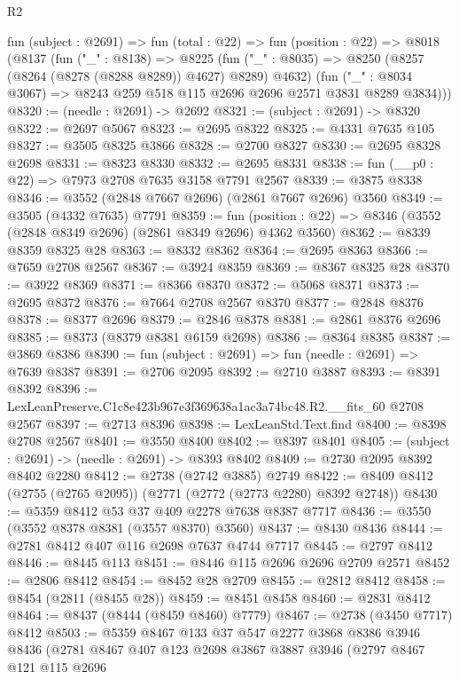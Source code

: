 \begin{lexlean}{R2}
\begin{coremodule}
  fun (subject : @2691) =>
  fun (total : @22) =>
  fun (position : @22) =>
  @8018
    (@8137
      (fun ("_" : @8138) =>
      @8225
        (fun ("_" : @8035) => @8250 (@8257 (@8264 (@8278 (@8288 @8289)) @4627) @8289) @4632)
        (fun ("_" : @8034 @3067) => @8243 @259 @518 @115 @2696 @2696 @2571 @3831 @8289 @3834)))
@8320 := (needle : @2691) -> @2692
@8321 := (subject : @2691) -> @8320
@8322 := @2697 @5067
@8323 := @2695 @8322
@8325 := @4331 @7635 @105
@8327 := @3505 @8325 @3866
@8328 := @2700 @8327
@8330 := @2695 @8328 @2698
@8331 := @8323 @8330
@8332 := @2695 @8331
@8338 := fun (__p0 : @22) => @7973 @2708 @7635 @3158 @7791 @2567
@8339 := @3875 @8338
@8346 := @3552 (@2848 @7667 @2696) (@2861 @7667 @2696) @3560
@8349 := @3505 (@4332 @7635) @7791
@8359 := fun (position : @22) => @8346 (@3552 (@2848 @8349 @2696) (@2861 @8349 @2696) @4362 @3560)
@8362 := @8339 @8359 @8325 @28
@8363 := @8332 @8362
@8364 := @2695 @8363
@8366 := @7659 @2708 @2567
@8367 := @3924 @8359
@8369 := @8367 @8325 @28
@8370 := @3922 @8369
@8371 := @8366 @8370
@8372 := @5068 @8371
@8373 := @2695 @8372
@8376 := @7664 @2708 @2567 @8370
@8377 := @2848 @8376
@8378 := @8377 @2696
@8379 := @2846 @8378
@8381 := @2861 @8376 @2696
@8385 := @8373 (@8379 @8381 @6159 @2698)
@8386 := @8364 @8385
@8387 := @3869 @8386
@8390 := fun (subject : @2691) => fun (needle : @2691) => @7639 @8387
@8391 := @2706 @2095
@8392 := @2710 @3887
@8393 := @8391 @8392
@8396 := LexLeanPreserve.C1c8e423b967e3f369638a1ac3a74bc48.R2.__fits_60 @2708 @2567
@8397 := @2713 @8396
@8398 := LexLeanStd.Text.find
@8400 := @8398 @2708 @2567
@8401 := @3550 @8400
@8402 := @8397 @8401
@8405 := (subject : @2691) -> (needle : @2691) -> @8393 @8402
@8409 := @2730 @2095 @8392 @8402 @2280
@8412 := @2738 (@2742 @3885) @2749
@8422 := @8409 @8412 (@2755 (@2765 @2095)) (@2771 (@2772 (@2773 @2280) @8392 @2748))
@8430 := @5359 @8412 @53 @37 @409 @2278 @7638 @8387 @7717
@8436 := @3550 (@3552 @8378 @8381 (@3557 @8370) @3560)
@8437 := @8430 @8436
@8444 := @2781 @8412 @407 @116 @2698 @7637 @4744 @7717
@8445 := @2797 @8412
@8446 := @8445 @113
@8451 := @8446 @115 @2696 @2696 @2709 @2571
@8452 := @2806 @8412
@8454 := @8452 @28 @2709
@8455 := @2812 @8412
@8458 := @8454 (@2811 (@8455 @28))
@8459 := @8451 @8458
@8460 := @2831 @8412
@8464 := @8437 (@8444 (@8459 @8460) @7779)
@8467 := @2738 (@3450 @7717) @8412
@8503 := @5359
    @8467
    @133
    @37
    @547
    @2277
    @3868
    @8386
    @3946
    @8436
    (@2781
      @8467
      @407
      @123
      @2698
      @3867
      @3887
      @3946
      (@2797
        @8467
        @121
        @115
        @2696

\end{coremodule}
\end{lexlean}
